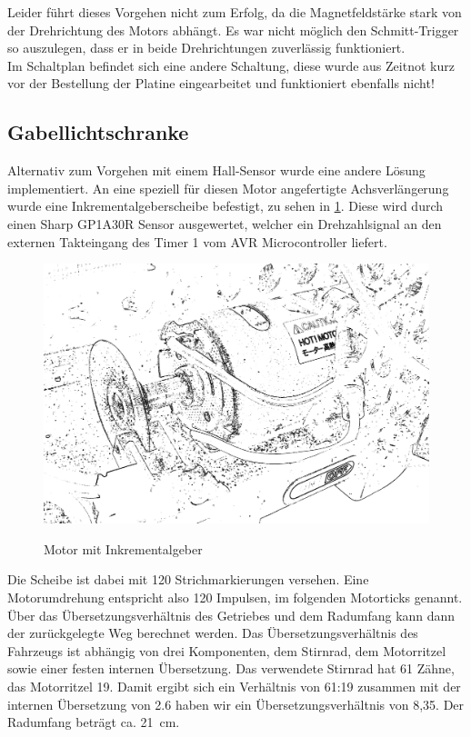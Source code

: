 Leider führt dieses Vorgehen nicht zum Erfolg, da die Magnetfeldstärke stark von der Drehrichtung des Motors abhängt. Es war nicht möglich
den Schmitt-Trigger so auszulegen, dass er in beide Drehrichtungen zuverlässig funktioniert.\\

Im Schaltplan befindet sich eine andere Schaltung, diese wurde aus Zeitnot kurz vor der Bestellung der Platine eingearbeitet und funktioniert ebenfalls nicht!

\subsection{Gabellichtschranke}

Alternativ zum Vorgehen mit einem Hall-Sensor wurde eine andere Lösung implementiert. An eine speziell für diesen Motor angefertigte Achsverlängerung wurde eine Inkrementalgeberscheibe befestigt, zu sehen in \cref{fig:gabellichtschranke}. 
Diese wird durch einen Sharp GP1A30R Sensor ausgewertet, welcher ein Drehzahlsignal an den externen Takteingang des Timer 1 vom AVR Microcontroller liefert.
\begin{figure}[H]
\centering
\includegraphics[width=.8\textwidth]{odometrie.png}\\
\caption{Motor mit Inkrementalgeber}%
\label{fig:gabellichtschranke}
\end{figure}

Die Scheibe ist dabei mit 120 Strichmarkierungen versehen. Eine Motorumdrehung entspricht also 120 Impulsen, im folgenden Motorticks genannt. Über das Übersetzungsverhältnis des Getriebes und dem Radumfang kann dann 
der zurückgelegte Weg berechnet werden. Das Übersetzungsverhältnis des Fahrzeugs ist abhängig von drei Komponenten, dem Stirnrad, dem Motorritzel sowie einer festen internen Übersetzung. Das verwendete Stirnrad hat
61 Zähne, das Motorritzel 19. Damit ergibt sich ein Verhältnis von 61:19 zusammen mit der internen Übersetzung von 2.6  
haben wir ein Übersetzungsverhältnis von 8,35. Der Radumfang beträgt ca. \SI{21}{\cm}.


